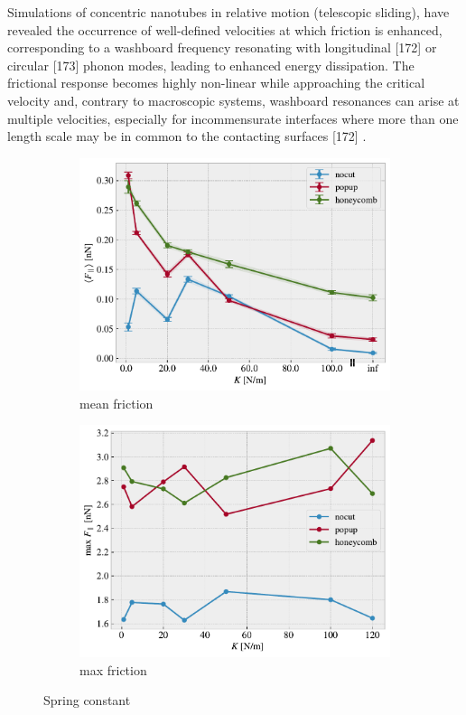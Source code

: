 Simulations of concentric nanotubes in relative motion (telescopic sliding), have revealed the occurrence of well-defined velocities at which friction is enhanced, corresponding to a washboard frequency resonating with longitudinal [172] or circular [173] phonon modes, leading to enhanced energy dissipation. The frictional response becomes highly non-linear while approaching the critical velocity and, contrary to macroscopic systems, washboard resonances can arise at multiple velocities, especially for incommensurate interfaces where more than one length scale may be in common to the contacting surfaces [172] \cite{Manini_2016}.


\begin{figure}[H]
  \centering
  \begin{subfigure}[b]{0.49\textwidth}
      \centering
      \includegraphics[width=\textwidth]{figures/baseline/variables_spring_mean_K30.pdf}
      \caption{mean friction}
      \label{fig:var_K_mean}
  \end{subfigure}
  \hfill
  \begin{subfigure}[b]{0.49\textwidth}
      \centering
      \includegraphics[width=\textwidth]{figures/baseline/variables_spring_max_K30.pdf}
      \caption{max friction}
      \label{fig:var_K_max}
  \end{subfigure}
  \hfill
     \caption{Spring constant}
     \label{fig:var_K}
\end{figure}

